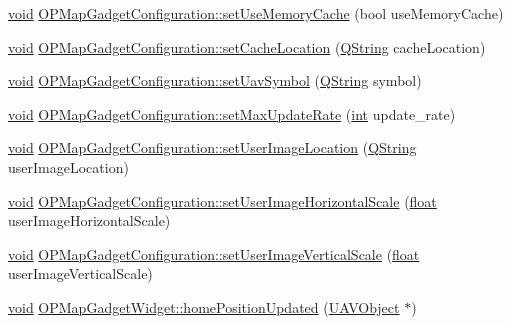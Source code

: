 \begin{DoxyCompactItemize}
\item 
\hyperlink{group___u_a_v_objects_plugin_ga444cf2ff3f0ecbe028adce838d373f5c}{void} \hyperlink{group___o_p_map_plugin_gaf9f7efc1e46ac61b758479e530a3123a}{O\-P\-Map\-Gadget\-Configuration\-::set\-Use\-Memory\-Cache} (bool use\-Memory\-Cache)
\item 
\hyperlink{group___u_a_v_objects_plugin_ga444cf2ff3f0ecbe028adce838d373f5c}{void} \hyperlink{group___o_p_map_plugin_ga1535dec7606615519b068c23a1ca2732}{O\-P\-Map\-Gadget\-Configuration\-::set\-Cache\-Location} (\hyperlink{group___u_a_v_objects_plugin_gab9d252f49c333c94a72f97ce3105a32d}{Q\-String} cache\-Location)
\item 
\hyperlink{group___u_a_v_objects_plugin_ga444cf2ff3f0ecbe028adce838d373f5c}{void} \hyperlink{group___o_p_map_plugin_gad3440c50dc4df5efc75c2e9c495bd87c}{O\-P\-Map\-Gadget\-Configuration\-::set\-Uav\-Symbol} (\hyperlink{group___u_a_v_objects_plugin_gab9d252f49c333c94a72f97ce3105a32d}{Q\-String} symbol)
\item 
\hyperlink{group___u_a_v_objects_plugin_ga444cf2ff3f0ecbe028adce838d373f5c}{void} \hyperlink{group___o_p_map_plugin_gaf7ae2720705ea7adc0d5ae53aca97ecc}{O\-P\-Map\-Gadget\-Configuration\-::set\-Max\-Update\-Rate} (\hyperlink{ioapi_8h_a787fa3cf048117ba7123753c1e74fcd6}{int} update\-\_\-rate)
\item 
\hyperlink{group___u_a_v_objects_plugin_ga444cf2ff3f0ecbe028adce838d373f5c}{void} \hyperlink{group___o_p_map_plugin_ga4d5dd75bf8d9fc4a61f9b4ccb1073326}{O\-P\-Map\-Gadget\-Configuration\-::set\-User\-Image\-Location} (\hyperlink{group___u_a_v_objects_plugin_gab9d252f49c333c94a72f97ce3105a32d}{Q\-String} user\-Image\-Location)
\item 
\hyperlink{group___u_a_v_objects_plugin_ga444cf2ff3f0ecbe028adce838d373f5c}{void} \hyperlink{group___o_p_map_plugin_ga0e854a0411317eadea17f6982d319157}{O\-P\-Map\-Gadget\-Configuration\-::set\-User\-Image\-Horizontal\-Scale} (\hyperlink{_super_l_u_support_8h_a6a1bb6ed41f44b60e7bd83b0e9945aa7}{float} user\-Image\-Horizontal\-Scale)
\item 
\hyperlink{group___u_a_v_objects_plugin_ga444cf2ff3f0ecbe028adce838d373f5c}{void} \hyperlink{group___o_p_map_plugin_ga90c2b51792e97ee806fe50d8215f3461}{O\-P\-Map\-Gadget\-Configuration\-::set\-User\-Image\-Vertical\-Scale} (\hyperlink{_super_l_u_support_8h_a6a1bb6ed41f44b60e7bd83b0e9945aa7}{float} user\-Image\-Vertical\-Scale)
\item 
\hyperlink{group___u_a_v_objects_plugin_ga444cf2ff3f0ecbe028adce838d373f5c}{void} \hyperlink{group___o_p_map_plugin_gae67526d9495209b93360c1fae84e3d47}{O\-P\-Map\-Gadget\-Widget\-::home\-Position\-Updated} (\hyperlink{class_u_a_v_object}{U\-A\-V\-Object} $\ast$)

\end{DoxyCompactItemize}
